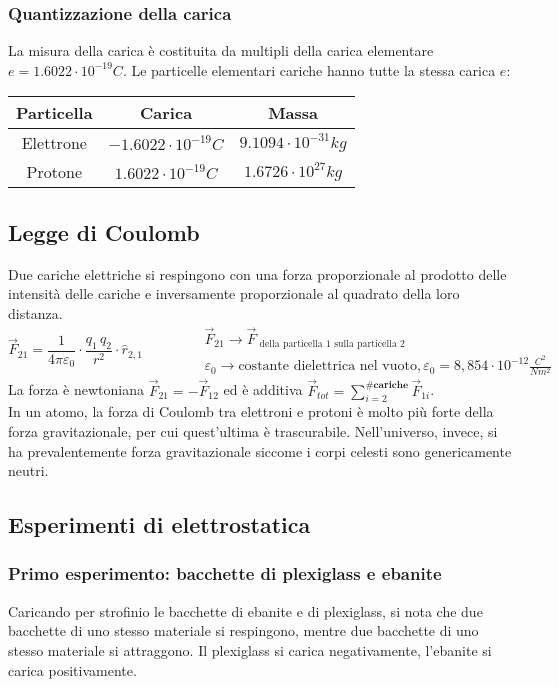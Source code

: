 \documentclass[a4paper]{article}
\begin{document}
\subsubsection*{Quantizzazione della carica}
La misura della carica è costituita da multipli della carica elementare \(e = 1.6022 \cdot 10^{-19} C\). Le particelle elementari
cariche hanno tutte la stessa carica \(e\):
\begin{center}
	\begin{tabular}{c c c}
		\textbf{Particella} & \textbf{Carica} & \textbf{Massa} \\
		\toprule
		Elettrone & \(-1.6022 \cdot 10^{-19} C\) & \(9.1094 \cdot 10^{-31} kg\) \\
		\midrule
		Protone & \(1.6022 \cdot 10^{-19} C\) & \(1.6726 \cdot 10^{27} kg\) \\
		\bottomrule
	\end{tabular}
\end{center}

\subsection{Legge di Coulomb}
Due cariche elettriche si respingono con una forza proporzionale al prodotto delle intensità delle cariche e inversamente
proporzionale al quadrato della loro distanza.
\[\vec{F}_{21} = \frac{1}{4 \pi \varepsilon_0} \cdot \frac{q_1 \, q_2}{r^2} \cdot \hat{r}_{2,1} \qquad \qquad \begin{matrix}
	\vec{F}_{21} \rightarrow \vec{F}_\text{ della particella 1 sulla particella 2}  \qquad \qquad \qquad \qquad \qquad \;\;\;\; \\
	\varepsilon_0 \rightarrow \text{costante dielettrica nel vuoto}, \varepsilon_0 = 8,854 \cdot 10^{-12} \frac{C^2}{Nm ^2}
\end{matrix}\]
La forza è newtoniana \(\vec{F}_{21} = -\vec{F}_{12}\) ed è additiva \(\vec{F}_{tot} = \sum_{i=2}^{\# \textbf{cariche}} \vec{F}_{1i}\). \\
In un atomo, la forza di Coulomb tra elettroni e protoni è molto più forte della forza gravitazionale, per cui quest'ultima è
trascurabile. Nell'universo, invece, si ha prevalentemente forza gravitazionale siccome i corpi celesti sono genericamente neutri.

\subsection{Esperimenti di elettrostatica}
\subsubsection*{Primo esperimento: bacchette di plexiglass e ebanite}
Caricando per strofinio le bacchette di ebanite e di plexiglass, si nota che due bacchette di uno stesso materiale si respingono,
mentre due bacchette di uno stesso materiale si attraggono. Il plexiglass si carica negativamente, l'ebanite si carica positivamente.
\end{document}
